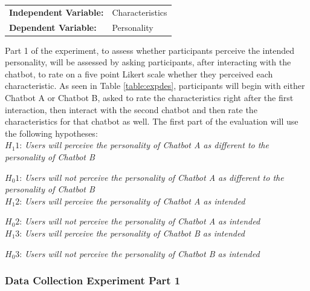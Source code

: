 \vspace{2,5mm}

\begin{tabular}{ l l }
    \textbf{Independent Variable:} & Characteristics \\ 
    \textbf{Dependent Variable:} & Personality \\  
\end{tabular}

\vspace{2,5mm}

Part 1 of the experiment, to assess whether participants perceive the intended personality, will be assessed by asking participants, after interacting with the chatbot, to rate on a five point Likert scale whether they perceived each characteristic. As seen in Table \ref{table:expdes}, participants will begin with either Chatbot A or Chatbot B, asked to rate the characteristics right after the first interaction, then interact with the second chatbot and then rate the characteristics for that chatbot as well. The first part of the evaluation will use the following hypotheses:\\
    
    $H_1 1$: \textit{Users will perceive the personality of Chatbot A as different to the personality of Chatbot B}
    
    $H_0 1$: \textit{Users will not perceive the personality of Chatbot A as different to the personality of Chatbot B} \\
  
    $H_1 2$: \textit{Users will perceive the personality of Chatbot A as intended} 
    
    $H_0 2$: \textit{Users will not perceive the personality of Chatbot A as intended}\\
   
    $H_1 3$: \textit{Users will perceive the personality of Chatbot B as intended}
   
    $H_0 3$: \textit{Users will not perceive the personality of Chatbot B as intended}\\
    

\subsubsection{Data Collection Experiment Part 1}

